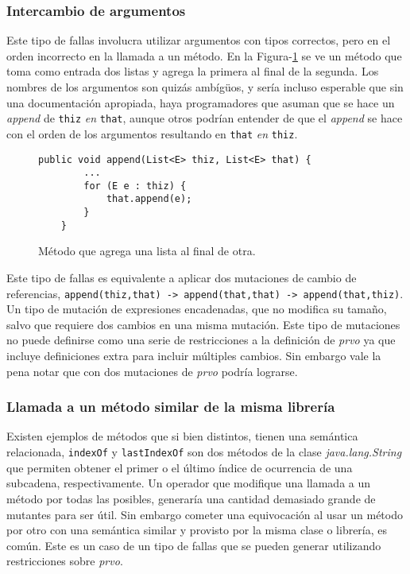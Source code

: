 \subsubsection{Intercambio de argumentos}

Este tipo de fallas involucra utilizar argumentos con tipos correctos, pero en el orden incorrecto en la llamada a un m\'etodo. En la Figura-\ref{figures.examples.argumentSwap.example1} se ve un m\'etodo que toma como entrada dos listas y agrega la primera al final de la segunda. Los nombres de los argumentos son quiz\'as amb\'ig\"{u}os, y ser\'ia incluso esperable que sin una documentaci\'on apropiada, haya programadores que asuman que se hace un \emph{append} de \texttt{thiz} \emph{en} \texttt{that}, aunque otros podr\'ian entender de que el \emph{append} se hace con el orden de los argumentos resultando en \texttt{that} \emph{en} \texttt{thiz}. 

\begin{figure}
	\begin{lstlisting}[frame=single, mathescape=true,framexleftmargin=1.5em]
	public void append(List<E> thiz, List<E> that) {
		...
		for (E e : thiz) {
			that.append(e);
		}
	}
	\end{lstlisting}
	\caption{M\'etodo que agrega una lista al final de otra.}
	\label{figures.examples.argumentSwap.example1}
\end{figure}

Este tipo de fallas es equivalente a aplicar dos mutaciones de cambio de referencias, \lstinline|append(thiz,that) -> append(that,that) -> append(that,thiz)|. Un tipo de mutaci\'on de expresiones encadenadas, que no modifica su tama\~no, salvo que requiere dos cambios en una misma mutaci\'on. Este tipo de mutaciones no puede definirse como una serie de restricciones a la definici\'on de \emph{prvo} ya que incluye definiciones extra para incluir m\'ultiples cambios. Sin embargo vale la pena notar que con dos mutaciones de \emph{prvo} podr\'ia lograrse.

\subsubsection{Llamada a un m\'etodo similar de la misma librer\'ia}

Existen ejemplos de m\'etodos que si bien distintos, tienen una sem\'antica relacionada, \texttt{indexOf} y \texttt{lastIndexOf} son dos m\'etodos de la clase \emph{java.lang.String} que permiten obtener el primer o el \'ultimo \'indice de ocurrencia de una subcadena, respectivamente. Un operador que modifique una llamada a un m\'etodo por todas las posibles, generar\'ia una cantidad demasiado grande de mutantes para ser \'util. Sin embargo cometer una equivocaci\'on al usar un m\'etodo por otro con una sem\'antica similar y provisto por la misma clase o librer\'ia, es com\'un. Este es un caso de un tipo de fallas que se pueden generar utilizando restricciones sobre \emph{prvo}.

